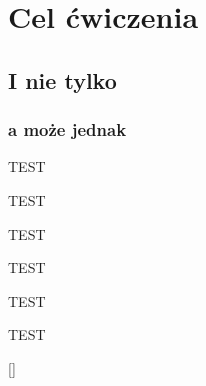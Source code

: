 \documentclass[12pt, titlepage]{article} %
\begin{document}


\section{Cel ćwiczenia}
\subsection{I nie tylko}
\subsubsection{a może jednak}

TEST

TEST

TEST

TEST

TEST

TEST


[\fontsize{13}{10}\selectfont\ttfamily]

\end{document}
